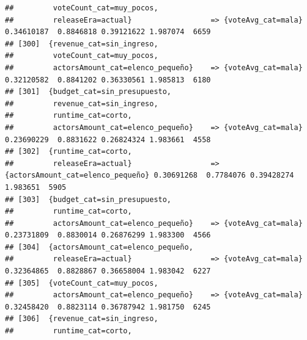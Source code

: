 \documentclass[
]{article}
\begin{document}
\begin{verbatim}
##         voteCount_cat=muy_pocos,                                                                                                
##         releaseEra=actual}                  => {voteAvg_cat=mala}                0.34610187  0.8846818 0.39121622 1.987074  6659
## [300]  {revenue_cat=sin_ingreso,                                                                                                
##         voteCount_cat=muy_pocos,                                                                                                
##         actorsAmount_cat=elenco_pequeño}    => {voteAvg_cat=mala}                0.32120582  0.8841202 0.36330561 1.985813  6180
## [301]  {budget_cat=sin_presupuesto,                                                                                             
##         revenue_cat=sin_ingreso,                                                                                                
##         runtime_cat=corto,                                                                                                      
##         actorsAmount_cat=elenco_pequeño}    => {voteAvg_cat=mala}                0.23690229  0.8831622 0.26824324 1.983661  4558
## [302]  {runtime_cat=corto,                                                                                                      
##         releaseEra=actual}                  => {actorsAmount_cat=elenco_pequeño} 0.30691268  0.7784076 0.39428274 1.983651  5905
## [303]  {budget_cat=sin_presupuesto,                                                                                             
##         runtime_cat=corto,                                                                                                      
##         actorsAmount_cat=elenco_pequeño}    => {voteAvg_cat=mala}                0.23731809  0.8830014 0.26876299 1.983300  4566
## [304]  {actorsAmount_cat=elenco_pequeño,                                                                                        
##         releaseEra=actual}                  => {voteAvg_cat=mala}                0.32364865  0.8828867 0.36658004 1.983042  6227
## [305]  {voteCount_cat=muy_pocos,                                                                                                
##         actorsAmount_cat=elenco_pequeño}    => {voteAvg_cat=mala}                0.32458420  0.8823114 0.36787942 1.981750  6245
## [306]  {revenue_cat=sin_ingreso,                                                                                                
##         runtime_cat=corto,                                                                                                      

\end{verbatim}
\end{document}
